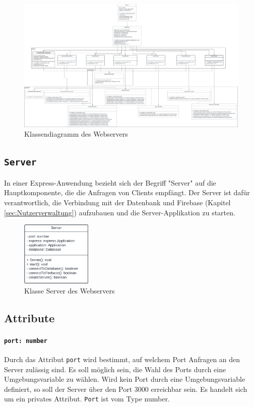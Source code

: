 \documentclass{entwurfsheft}
\begin{document}
\begin{sloppypar}
\begin{figure}[htp]
    \centering
    \includegraphics[width = 1\textwidth]{images/webserver/webserver.pdf}
    \caption{Klassendiagramm des Webservers}
    \label{fig:webserver}
\end{figure}

\newpage

\subsection{\texttt{Server}}\label{sec:Server}
In einer Express-Anwendung bezieht sich der Begriff "Server" auf die Hauptkomponente, die die Anfragen von Clients empfängt.
Der Server ist dafür verantwortlich, die Verbindung mit der Datenbank und Firebase (Kapitel \ref{sec:Nutzerverwaltung}) aufzubauen und die Server-Applikation zu starten.

\begin{figure}[htp]
    \centering
    \includegraphics[width = 0.3\textwidth]{images/webserver/server.pdf}
    \caption{Klasse Server des Webservers}
    \label{fig:server}
\end{figure}

\subsection*{Attribute}
\paragraph{\texttt{port: number}}
Durch das Attribut \texttt{port} wird bestimmt, auf welchem Port Anfragen an den Server zulässig sind. Es soll möglich sein, die Wahl des Ports durch eine Umgebungsvariable zu wählen. Wird kein Port durch eine Umgebungsvariable definiert, so soll der Server über den Port 3000 erreichbar sein. Es handelt sich um ein privates Attribut.
\texttt{Port} ist vom Type number.

\end{sloppypar}
\end{document}
